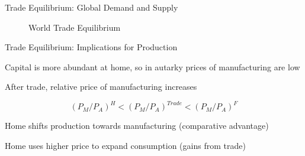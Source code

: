 \documentclass[notes,11pt, aspectratio=169, xcolor=table]{beamer}
\newenvironment{wideitemize}{\itemize\addtolength{\itemsep}{10pt}}{\enditemize}
\begin{document}
\begin{frame}{Trade Equilibrium: Global Demand and Supply}
\begin{figure}
        \caption{World Trade Equilibrium}
    \label{fig: trade-eqm}
\end{figure}
\end{frame}

\begin{frame}{Trade Equilibrium: Implications for Production}
\begin{wideitemize}
    \item Capital is more abundant at home, so in autarky prices of manufacturing are low
    
    \item After trade, relative price of manufacturing increases
    

    \begin{equation*}
        (P_{M}/P_{A})^{H} < (P_{M}/P_{A})^{Trade} < (P_{M}/P_{A})^{F}
    \end{equation*}

    \item Home shifts production towards manufacturing (comparative advantage)
    
    \item Home uses higher price to expand consumption (gains from trade)
        
\end{wideitemize}
\end{frame}
\end{document}
